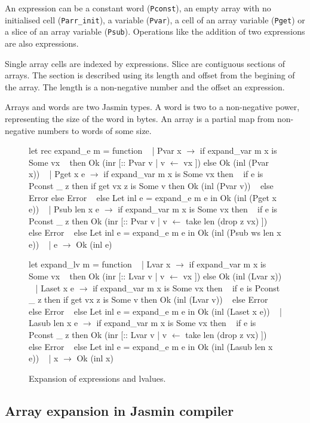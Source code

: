\documentclass{article}
\begin{document}
An expression can be a constant word (\texttt{Pconst}), an empty array with no
initialised cell (\texttt{Parr\_init}), a variable (\texttt{Pvar}), a cell of an
array variable (\texttt{Pget}) or a slice of an array variable (\texttt{Psub}).
Operations like the addition of two expressions are also expressions.

Single array cells are indexed by expressions. Slice are contiguous sections of
arrays. The section is described using its length and offset from the begining
of the array. The length is a non-negative number and the offset an expression.

\smallskip

Arrays and words are two Jasmin types. A word is two to a non-negative power,
representing the size of the word in bytes. An array is a partial map from
non-negative numbers to words of some size.

\begin{figure}[t]
\obeylines\obeyspaces\ttfamily%
let rec expand\_e m = function
~ | Pvar x \(\rightarrow\) if expand\_var m x is Some vx
~   then Ok (inr [:: Pvar v | v \(\leftarrow\) vx ]) else Ok (inl (Pvar x))
~ | Pget x e \(\rightarrow\) if expand\_var m x is Some vx then
~     if e is Pconst \_ z then if get vx z is Some v then Ok (inl (Pvar v))
~     else Error else Error
~   else Let inl e = expand\_e m e in Ok (inl (Pget x e))
~ | Psub len x e \(\rightarrow\) if expand\_var m x is Some vx then
~     if e is Pconst \_ z then Ok (inr [:: Pvar v | v \(\leftarrow\) take len (drop z vx) ])
~     else Error
~   else Let inl e = expand\_e m e in Ok (inl (Psub ws len x e))
~ | e \(\rightarrow\) Ok (inl e)

let expand\_lv m = function
~ | Lvar x \(\rightarrow\) if expand\_var m x is Some vx
~   then Ok (inr [:: Lvar v | v \(\leftarrow\) vx ]) else Ok (inl (Lvar x))
~ | Laset x e \(\rightarrow\) if expand\_var m x is Some vx then
~     if e is Pconst \_ z then if get vx z is Some v then Ok (inl (Lvar v))
~     else Error else Error
~   else Let inl e = expand\_e m e in Ok (inl (Laset x e))
~ | Lasub len x e \(\rightarrow\) if expand\_var m x is Some vx then
~     if e is Pconst \_ z then Ok (inr [:: Lvar v | v \(\leftarrow\) take len (drop z vx) ])
~     else Error
~   else Let inl e = expand\_e m e in Ok (inl (Lasub len x e))
~ | x \(\rightarrow\) Ok (inl x)
\normalfont%
\caption{Expansion of expressions and lvalues.}\label{fig:fullexp}
\end{figure}

\subsection{Array expansion in Jasmin compiler}
\end{document}
